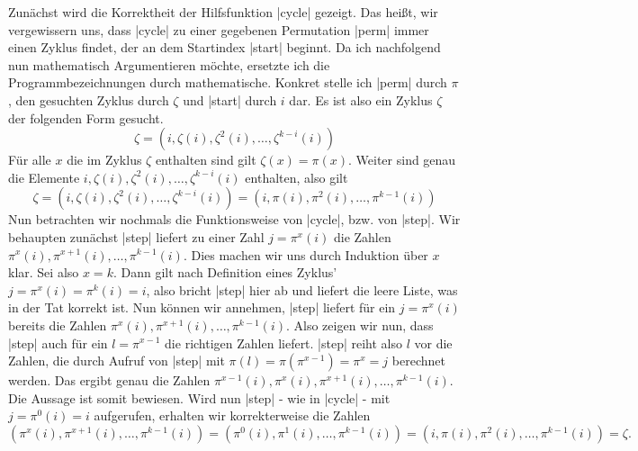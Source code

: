 Zunächst wird die Korrektheit der Hilfsfunktion |cycle| gezeigt.
Das heißt, wir vergewissern uns, dass |cycle| zu einer gegebenen Permutation |perm| immer einen Zyklus findet, der an dem Startindex |start| beginnt.
Da ich nachfolgend nun mathematisch Argumentieren möchte, ersetzte ich die Programmbezeichnungen durch mathematische.
Konkret stelle ich |perm| durch $\pi$, den gesuchten Zyklus durch $\zeta$ und |start| durch $i$ dar.
Es ist also ein Zyklus $\zeta$ der folgenden Form gesucht.
\[ \zeta = (i, \zeta(i),\zeta^2(i), \dots, \zeta^{k-i}(i)) \]
Für alle $x$ die im Zyklus $\zeta$ enthalten sind gilt $\zeta(x) = \pi(x)$.
Weiter sind genau die Elemente \linebreak $i, \zeta(i),\zeta^2(i), \dots, \zeta^{k-i}(i)$ enthalten, also gilt
\[ \zeta = (i, \zeta(i),\zeta^2(i), \dots, \zeta^{k-i}(i)) = (i, \pi(i),\pi^2(i), \dots, \pi^{k-1}(i)) \]
Nun betrachten wir nochmals die Funktionsweise von |cycle|, bzw. von |step|.
Wir behaupten zunächst |step| liefert zu einer Zahl $j = \pi^x(i)$ die Zahlen $\pi^x(i), \pi^{x+1}(i), \dots, \pi^{k-1}(i)$.
Dies machen wir uns durch Induktion über $x$ klar. Sei also $x = k$.
Dann gilt nach Definition eines Zyklus' $j = \pi^x(i) = \pi^k(i) = i$, also bricht |step| hier ab und liefert die leere Liste, was in der Tat korrekt ist.
Nun können wir annehmen, |step| liefert für ein $j = \pi^x(i)$ bereits die Zahlen $\pi^x(i), \pi^{x+1}(i), \dots, \pi^{k-1}(i)$.
Also zeigen wir nun, dass |step| auch für ein $l = \pi^{x-1}$ die richtigen Zahlen liefert.
|step| reiht also $l$ vor die Zahlen, die durch Aufruf von |step| mit $\pi(l) = \pi(\pi^{x-1}) = \pi^x = j$ berechnet werden.
Das ergibt genau die Zahlen $\pi^{x-1}(i), \pi^x(i), \pi^{x+1}(i), \dots, \pi^{k-1}(i)$.
Die Aussage ist somit bewiesen.
Wird nun |step| - wie in |cycle| - mit $j = \pi^0(i) = i$ aufgerufen, erhalten wir korrekterweise die Zahlen
\[ (\pi^x(i), \pi^{x+1}(i), \dots, \pi^{k-1}(i)) = (\pi^0(i), \pi^1(i), \dots, \pi^{k-1}(i)) = (i, \pi(i), \pi^2(i), \dots, \pi^{k-1}(i)) = \zeta.\]

